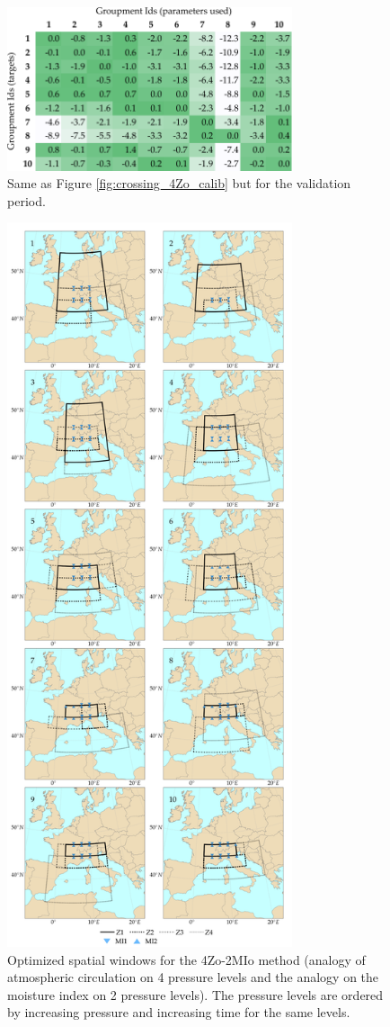 \documentclass[review]{elsarticle}
\begin{document}
\begin{figure}[htb]
	\centerline{\includegraphics[width=8.4cm]{figures/fig06.pdf}}
	\caption{Same as Figure \ref{fig:crossing_4Zo_calib} but for the validation period.}
	\label{fig:crossing_4Zo_valid}
\end{figure}

\begin{figure}[htb]
	\centerline{\includegraphics[width=8.4cm]{figures/fig07.pdf}}
	\caption{Optimized spatial windows for the 4Zo-2MIo method (analogy of atmospheric circulation on 4 pressure levels and the analogy on the moisture index on 2 pressure levels). The pressure levels are ordered by increasing pressure and increasing time for the same levels.}
	\label{fig:spatial_windows_4Zo-2MIo}
\end{figure}
\end{document}
